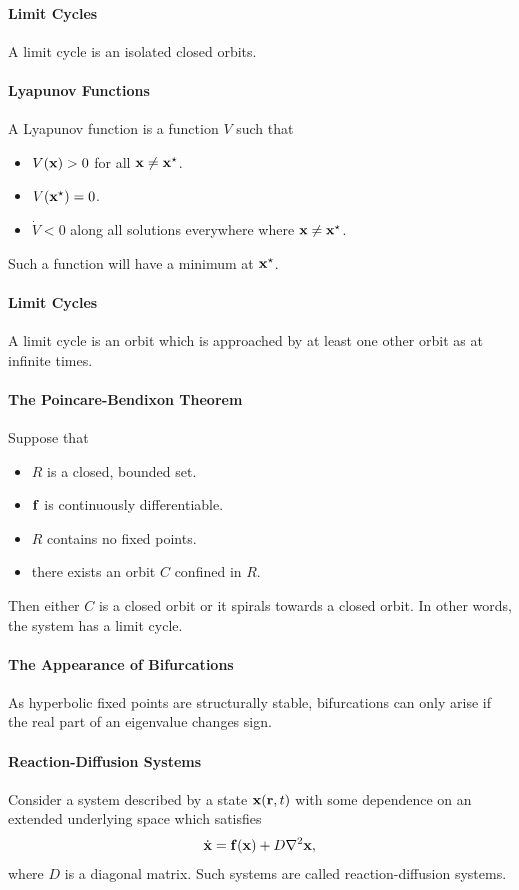 \paragraph{Limit Cycles}
A limit cycle is an isolated closed orbits.

\paragraph{Lyapunov Functions}
A Lyapunov function is a function $V$ such that
\begin{itemize}
	\item $V(\vb{x}) > 0$ for all $\vb{x} \neq \vb{x}^{\star}$.
	\item $V(\vb{x}^{\star}) = 0$.
	\item $\dot{V} < 0$ along all solutions everywhere where $\vb{x} \neq \vb{x}^{\star}$.
\end{itemize}
Such a function will have a minimum at $\vb{x}^{\star}$.

\paragraph{Limit Cycles}
A limit cycle is an orbit which is approached by at least one other orbit as at infinite times.

\paragraph{The Poincare-Bendixon Theorem}
Suppose that
\begin{itemize}
	\item $R$ is a closed, bounded set.
	\item $\vb{f}$ is continuously differentiable.
	\item $R$ contains no fixed points.
	\item there exists an orbit $C$ confined in $R$.
\end{itemize}
Then either $C$ is a closed orbit or it spirals towards a closed orbit. In other words, the system has a limit cycle.

\paragraph{The Appearance of Bifurcations}
As hyperbolic fixed points are structurally stable, bifurcations can only arise if the real part of an eigenvalue changes sign.

\paragraph{Reaction-Diffusion Systems}
Consider a system described by a state $\vb{x}(\vb{r}, t)$ with some dependence on an extended underlying space which satisfies
\begin{align*}
	\dot{\vb{x}} = \vb{f}(\vb{x}) + D\laplacian{\vb{x}},
\end{align*}
where $D$ is a diagonal matrix. Such systems are called reaction-diffusion systems.

